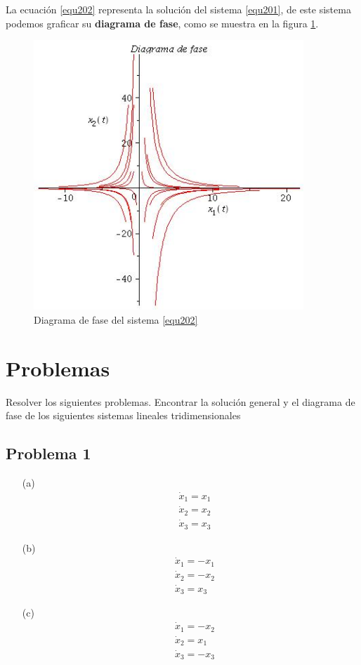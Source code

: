 \documentclass[12pt]{book}
\theoremstyle{definition}
\theoremstyle{remark}
\theoremstyle{plain}
\begin{document}
La ecuación \ref{equ202} representa la solución del sistema \ref{equ201}, de este sistema podemos graficar su \textbf{diagrama de fase}, como se muestra en la figura \ref{fig300}.


\begin{figure}
\centering
\includegraphics[width=4in]{diafasedesa.jpg}
\caption{Diagrama de fase del sistema \ref{equ202}}
\label{fig300}
\end{figure}

\section{Problemas}

Resolver los siguientes problemas. Encontrar la solución general y el diagrama de fase de los siguientes sistemas lineales tridimensionales

\subsection{Problema 1}
\begin{enumerate}
\item[(a)]
\begin{align*}
& \dot{x}_1  =  x_1 \\
& \dot{x}_2  =  x_2 \\
& \dot{x}_3  =  x_3 
\end{align*}

\item[(b)]
\begin{align*}
&\dot{x}_1  = -x_1 \\
&\dot{x}_2  =  -x_2 \\
&\dot{x}_3  =  x_3 
\end{align*}

\item[(c)]
\begin{align*}
&\dot{x}_1  =  -x_2 \\
&\dot{x}_2  =  x_1 \\
&\dot{x}_3  =  -x_3 
\end{align*}
\end{enumerate}
\end{document}

